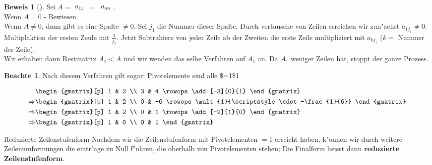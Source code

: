 \documentclass[fontsize=11pt,paper=a4,BCOR=0mm,DIV=11,automark,headsepline]{scrbook}
\theoremstyle{remark}
\theoremstyle{definition}
\newtheorem*{notte}{Beachte}
\theoremstyle{proof}
\newtheorem*{prof}{Beweis}
\theoremstyle{remark}
\begin{document}
\begin{prof}[] \label{}
Sei \(A=\begin{matrix}a_{11}&...&a_{nn}\end{matrix}\). \\
Wenn \(A=0\) - Bewiesen. \\
Wenn \(A\not=0\), dann gibt es eine Spalte \(\not= 0\). Sei
\(j_1\) die Nummer dieser Spalte. Durch vertausche von Zeilen erreichen wir
zun"achst \(a_{1j_1}\not= 0\). Multiplaktion der ersten Zeule mit
\(\frac{1}{j_1}\). Jetzt Subtrahiere von jeder Zeile ab der Zweiten die erste
Zeile multipliziert mit \(a_{kj_1}\) (\(k=\) Nummer der Zeile). \\

Wir erhalten dann Restmatrix \(A_1<A\) und wir wenden das selbe Verfahren auf
\(A_1\) an. Da \(A_1\) weniger Zeilen hat, stoppt der ganze Prozess.

\begin{notte}
Nach diesem Verfahren gilt sogar: Pivotelemente sind alle \$=1\$1
\end{notte}
\end{prof}


\begin{exa}
\begin{align*}
  & \begin{gmatrix}[p]
      1 & 2 \\
      3 & 4
      \rowops
      \add[-3]{0}{1}
    \end{gmatrix} \\
  \Rightarrow & \begin{gmatrix}[p]
      1 & 2 \\
      0 & -6
      \rowops
      \mult{1}{\scriptstyle\cdot-\frac{1}{6}}
    \end{gmatrix} \\
  \Rightarrow & \begin{gmatrix}[p]
      1 & 2 \\
      0 & 1
      \rowops
      \add[-2]{1}{0}
    \end{gmatrix} \\
  \Rightarrow & \begin{gmatrix}[p]
      1 & 0 \\
      0 & 1
    \end{gmatrix}
\end{align*}
\end{exa}

\begin{definition}{Reduzierte Zeilenstufenform}{}
Nachdem wir die Zeilenstufenform mit Pivotelementen \(=1\) erreicht haben, k"onnen
wir durch weitere Zeilenumformungen die eintr"age zu Null f"uhren, die oberhalb
von Pivotelementen stehen; Die Finalform heisst dann \textbf{reduzierte
Zeilenstufenform}.
\end{definition}
\end{document}
